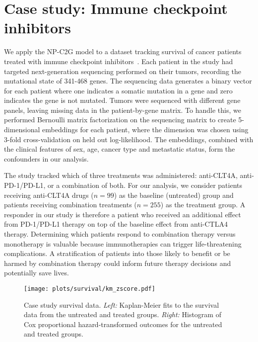 \section{Case study: Immune checkpoint inhibitors}
\label{sec:case-study}

We apply the NP-C2G model to a dataset tracking survival of cancer patients treated with immune checkpoint inhibitors~\citep{samstein:etal:2019:tmb-immunotherapy-survival}. Each patient in the study had targeted next-generation sequencing performed on their tumors, recording the mutational state of 341-468 genes. The sequencing data generates a binary vector for each patient where one indicates a somatic mutation in a gene and zero indicates the gene is not mutated. Tumors were sequenced with different gene panels, leaving missing data in the patient-by-gene matrix. To handle this, we performed Bernoulli matrix factorization on the sequencing matrix to create 5-dimensional embeddings for each patient, where the dimension was chosen using 3-fold cross-validation on held out log-likelihood. The embeddings, combined with the clinical features of sex, age, cancer type and metastatic status, form the confounders in our analysis.

The study tracked which of three treatments was administered: anti-CLT4A, anti-PD-1/PD-L1, or a combination of both. For our analysis, we consider patients receiving anti-CLT4A drugs ($n=99$) as the baseline (untreated) group and patients receiving combination treatments ($n=255$) as the treatment group. A responder in our study is therefore a patient who received an additional effect from PD-1/PD-L1 therapy on top of the baseline effect from anti-CTLA4 therapy. Determining which patients respond to combination therapy versus monotherapy is valuable because immunotherapies can trigger life-threatening complications. A stratification of patients into those likely to benefit or be harmed by combination therapy could inform future therapy decisions and potentially save lives.


\begin{figure*}
\centering %
\texttt{[image: plots/survival/km\_zscore.pdf]}
\caption{Case study survival data. \emph{Left:} Kaplan-Meier fits to the survival data from the untreated and treated groups. \emph{Right:} Histogram of Cox proportional hazard-transformed outcomes for the untreated and treated groups.}
\label{fig:case-study-data}
\end{figure*}

